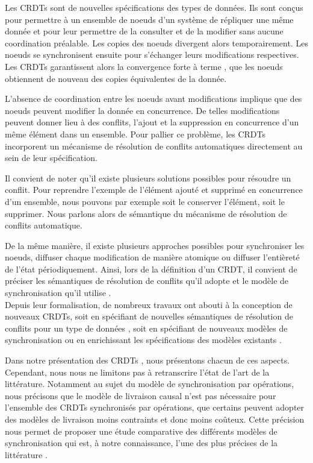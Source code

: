 Les \acfp{CRDT} \cite{shapiro_2011_crdt} sont de nouvelles spécifications des types de données.
Ils sont conçus pour permettre à un ensemble de noeuds d'un système de répliquer une même donnée et pour leur permettre de la consulter et de la modifier sans aucune coordination préalable.
Les copies des noeuds divergent alors temporairement.
Les noeuds se synchronisent ensuite pour s'échanger leurs modifications respectives.
Les \acp{CRDT} garantissent alors la convergence forte à terme \cite{shapiro_2011_crdt}, \ie que les noeuds obtiennent de nouveau des copies équivalentes de la donnée.

L'absence de coordination entre les noeuds avant modifications implique que des noeuds peuvent modifier la donnée en concurrence.
De telles modifications peuvent donner lieu à des conflits, \eg l'ajout et la suppression en concurrence d'un même élément dans un ensemble.
Pour pallier ce problème, les \acp{CRDT} incorporent un mécanisme de résolution de conflits automatiques directement au sein de leur spécification.

Il convient de noter qu'il existe plusieurs solutions possibles pour résoudre un conflit.
Pour reprendre l'exemple de l'élément ajouté et supprimé en concurrence d'un ensemble, nous pouvons par exemple soit le conserver l'élément, soit le supprimer.
Nous parlons alors de sémantique du mécanisme de résolution de conflits automatique.

De la même manière, il existe plusieurs approches possibles pour synchroniser les noeuds, \eg diffuser chaque modification de manière atomique ou diffuser l'entièreté de l'état périodiquement.
Ainsi, lors de la définition d'un \ac{CRDT}, il convient de préciser les sémantiques de résolution de conflits qu'il adopte et le modèle de synchronisation qu'il utilise \cite{2018-crdts-overview-preguica}.\\

Depuis leur formalisation, de nombreux travaux ont abouti à la conception de nouveaux \acp{CRDT}, soit en spécifiant de nouvelles sémantiques de résolution de conflits pour un type de données \cite{2020-cl-set-weihai}, soit en spécifiant de nouveaux modèles de synchronisation \cite{Almeida_2018} ou en enrichissant les spécifications des modèles existants \cite{baquero2017pure,enes2019}.

Dans notre présentation des \acp{CRDT} , nous présentons chacun de ces aspects.
Cependant, nous nous ne limitons pas à retranscrire l'état de l'art de la littérature.
Notamment au sujet du modèle de synchronisation par opérations, nous précisons que le modèle de livraison causal n'est pas nécessaire pour l'ensemble des \acp{CRDT} synchronisés par opérations, \ie que certains peuvent adopter des modèles de livraison moins contraints et donc moins coûteux.
Cette précision nous permet de proposer une étude comparative des différents modèles de synchronisation qui est, à notre connaissance, l'une des plus précises de la littérature .\\

